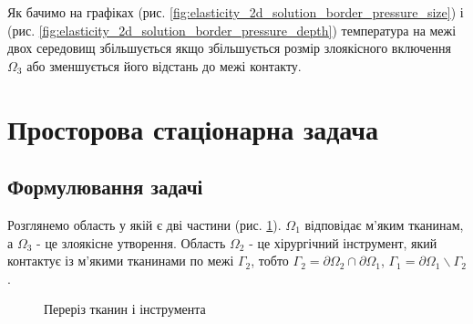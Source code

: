 Як бачимо на графіках (рис. \ref{fig:elasticity_2d_solution_border_pressure_size}) і (рис.
\ref{fig:elasticity_2d_solution_border_pressure_depth}) температура на межі двох середовищ збільшується якщо
збільшується розмір злоякісного включення $\Omega_3$ або зменшується його відстань до межі контакту.

\section{Просторова стаціонарна задача}

\subsection{Формулювання задачі}

Розглянемо область у якій є дві частини (рис. \ref{fig:elasticity_3d_domain}). $\Omega_1$ відповідає м'яким тканинам, а
$\Omega_3$ - це злоякісне утворення. Область $\Omega_2$ - це хірургічний інструмент, який контактує із м'якими тканинами
по межі $\Gamma_2$, тобто $\Gamma_2=\partial\Omega_2 \cap \partial\Omega_1$, 
$\Gamma_1 = \partial \Omega_1 \backslash \Gamma_2$.

\begin{figure}[ht!]
    \centering
    
    \caption{Переріз тканин і інструмента}
    \label{fig:elasticity_3d_domain}
\end{figure}


